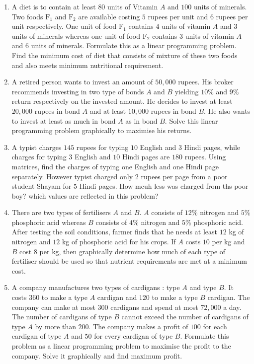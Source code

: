 \begin{enumerate}
	\item A diet is to contain at least $80$ units of Vitamin $A$ and $100$ units of minerals. 
Two foods $\text{F}_1$ and $\text{F}_2$ are available costing $5$ rupees per unit and $6$ rupees per unit respectively. 
One unit of food $\text{F}_1$ contains $4$ units of vitamin $A$ and $3$ units of minerals whereas
 one unit of food $\text{F}_2$ contains $3$ units of vitamin $A$ and $6$ units of minerals. 
 Formulate this as a linear programming problem. Find the minimum cost of diet that consists of mixture of these two foods and also meets minimum nutritional requirement.
 
 
 	\item  A retired person wants to invest an amount of $50,000$ rupees. His broker recommends investing in two type of bonds $A$ and $B$ yielding $10\%$ and $9\%$ return respectively on the invested amount. He decides to invest at least
$20,000$ rupees in bond $A$ and at least $10,000$ rupees in bond $B$. He also wants to invest at least as much in bond $A$ as in bond $B$. Solve this linear programming problem graphically to maximise his returns.

	\item A typist charges $145$ rupees for typing $10$ English and $3$ Hindi pages, while charges for typing $3$ English and $10$ Hindi pages are $180$ rupees. Using matrices, 
find the charges of typing one English and one Hindi page separately. 
However typist charged only $2$ rupees per page from a poor student Shayam for $5$ Hindi pages.
How mcuh less was charged from ths poor boy? which values are reflected in this problem?
\item There are two types of fertilisers $A$ and $B$. $A$ consists of $12$\% nitrogen and $5$\% phosphoric acid whereas $B$ consists of $4$\% nitrogen and $5$\% phosphoric acid. After testing the soil conditions, farmer finds that he needs at least $12$ kg of nitrogen and $12$ kg of phosphoric acid for his crops. If $A$ costs \rupee $10$ per kg and $B$ cost \rupee $8$ per kg, then graphically determine how much of each type of fertiliser should be used so that nutrient requirements are met at a minimum cost.
    \item A company manufactures two types of cardigans : type $A$ and type $B$. It costs \rupee $360$ to make a type $A$ cardigan and \rupee $120$ to make a type $B$ cardigan. The company can make at most $300$ cardigans and spend at most \rupee $72,000$ a day. The number of cardigans of type $B$ cannot exceed the number of cardigans of type $A$ by more than $200$. The company makes a profit of \rupee $100$ for each cardigan of type $A$ and \rupee $50$ for every cardigan of type $B$. Formulate this problem as a linear programming problem to maximise the profit to the company. Solve it graphically and find maximum profit.
\end{enumerate}

